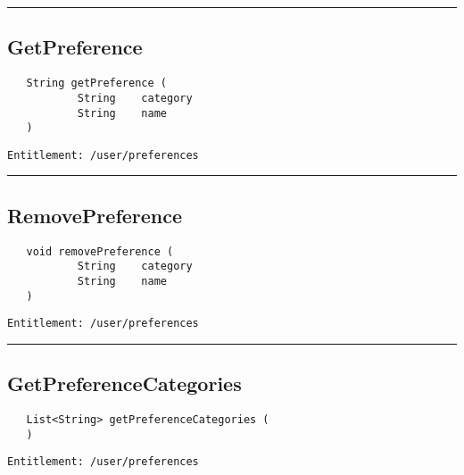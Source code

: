 \rule{12cm}{2pt}
\subsection{GetPreference}
\label{Api:GetPreference}
\begin{Verbatim}
   String getPreference (
           String    category
           String    name
   )
\end{Verbatim}
\begin{Verbatim}[formatcom=\color{Maroon}]
  Entitlement: /user/preferences
\end{Verbatim}



\rule{12cm}{2pt}
\subsection{RemovePreference}
\label{Api:RemovePreference}
\begin{Verbatim}
   void removePreference (
           String    category
           String    name
   )
\end{Verbatim}
\begin{Verbatim}[formatcom=\color{Maroon}]
  Entitlement: /user/preferences
\end{Verbatim}



\rule{12cm}{2pt}
\subsection{GetPreferenceCategories}
\label{Api:GetPreferenceCategories}
\begin{Verbatim}
   List<String> getPreferenceCategories (
   )
\end{Verbatim}
\begin{Verbatim}[formatcom=\color{Maroon}]
  Entitlement: /user/preferences
\end{Verbatim}



